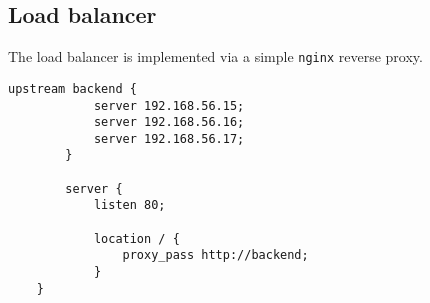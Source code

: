 \documentclass[../documentation.tex]{subfiles}
\begin{document}
\pagebreak

\subsection{Load balancer}

The load balancer is implemented via a simple
\texttt{nginx}\cite{nginx} reverse proxy.

\begin{lstlisting}[language=Nginx]
    upstream backend {
            server 192.168.56.15;
            server 192.168.56.16;
            server 192.168.56.17;
        }
        
        server {
            listen 80;
    
            location / {
                proxy_pass http://backend;
            }
    }
\end{lstlisting}
\end{document}
